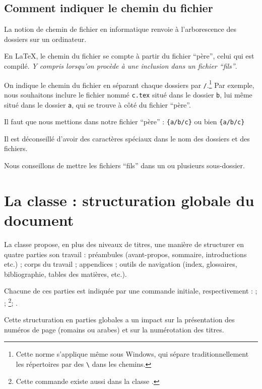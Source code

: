 \subsection{Comment indiquer le chemin du fichier}\label{chemin}

La notion de chemin de fichier en informatique renvoie à l'arborescence des dossiers sur un ordinateur.

En \LaTeX{}, le chemin du fichier se compte à partir du fichier \enquote{père}, celui qui est compilé. \emph{Y compris lorsqu'on procède à une inclusion dans un fichier \enquote{fils}}.

On indique le chemin du fichier en séparant chaque dossiers par \verb|/|.\footnote{Cette norme s'applique même sous Windows, qui sépare traditionnellement les répertoires par des \texttt{\textbackslash} dans les chemins.} Par exemple, nous souhaitons inclure le fichier nommé \verb|c.tex| situé dans le dossier \verb|b|, lui même situé dans le dossier \verb|a|, qui se trouve à côté du fichier \enquote{père}.

Il faut que nous mettions dans notre fichier \enquote{père} : \verb|{a/b/c}|
ou bien
\verb|{a/b/c}|

\begin{attention}

Il est déconseillé d'avoir des caractères spéciaux dans le nom des dossiers et des fichiers.
\end{attention}

Nous conseillons de mettre les fichiers \enquote{fils} dans un ou plusieurs sous-dossier.

\section{La classe  : structuration globale du document}\label{sectionbook}

La classe  propose, en plus des niveaux de titres, une manière de structurer en quatre parties son travail : préambules (avant-propos, sommaire, introductions etc.) ; corps du travail ; appendices ; outils de navigation (index, glossaires, bibliographie, tables des matières,  etc.). 

Chacune de ces parties est indiquée par une commande initiale, respectivement :  ;  ; \footnote{Cette commande existe aussi dans la classe .}; .

Cette structuration en parties globales a un impact sur la présentation des numéros de page (romains ou arabes) et sur la numérotation des titres.


